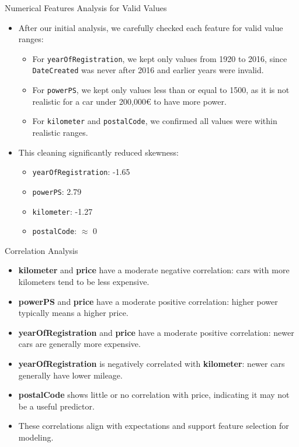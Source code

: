 \documentclass{beamer}
\begin{document}
\begin{frame}{Numerical Features Analysis for Valid Values}
    \begin{itemize}
        \item After our initial analysis, we carefully checked each feature for valid value ranges:
        \begin{itemize}
            \item For \texttt{yearOfRegistration}, we kept only values from 1920 to 2016, since \texttt{DateCreated} was never after 2016 and earlier years were invalid.
            \item For \texttt{powerPS}, we kept only values less than or equal to 1500, as it is not realistic for a car under 200,000€ to have more power.
            \item For \texttt{kilometer} and \texttt{postalCode}, we confirmed all values were within realistic ranges.
        \end{itemize}
        \item This cleaning significantly reduced skewness:
        \begin{itemize}
            \item \texttt{yearOfRegistration}: -1.65
            \item \texttt{powerPS}: 2.79
            \item \texttt{kilometer}: -1.27
            \item \texttt{postalCode}: $\approx$ 0
        \end{itemize}
    \end{itemize}
\end{frame}

\begin{frame}{Correlation Analysis}
    \begin{itemize}
        \item \textbf{kilometer} and \textbf{price} have a moderate negative correlation: cars with more kilometers tend to be less expensive.
        \item \textbf{powerPS} and \textbf{price} have a moderate positive correlation: higher power typically means a higher price.
        \item \textbf{yearOfRegistration} and \textbf{price} have a moderate positive correlation: newer cars are generally more expensive.
        \item \textbf{yearOfRegistration} is negatively correlated with \textbf{kilometer}: newer cars generally have lower mileage.
        \item \textbf{postalCode} shows little or no correlation with price, indicating it may not be a useful predictor.
        \item These correlations align with expectations and support feature selection for modeling.
    \end{itemize}
\end{frame}
\end{document}

